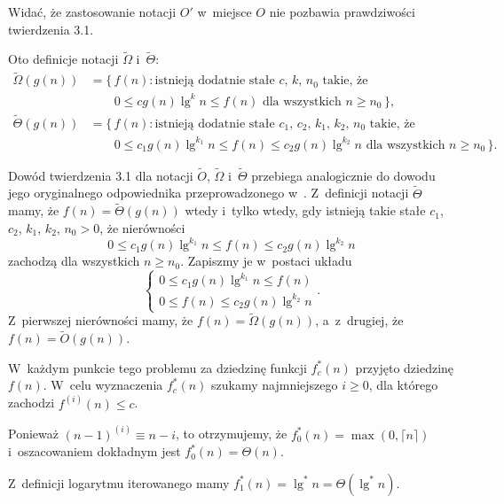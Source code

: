 Widać, że zastosowanie notacji $O'$ w~miejsce $O$ nie pozbawia prawdziwości twierdzenia 3.1.

\subproblem %
Oto definicje notacji $\widetilde{\Omega}$ i~$\widetilde{\Theta}$:
\[
	\begin{split}
		\widetilde{\Omega}(g(n)) &= \bigl\{\,f(n):\text{istnieją dodatnie stałe $c$, $k$, $n_0$ takie, że} \\
		&\qquad 0 \le cg(n)\lg^kn \le f(n) \text{ dla wszystkich $n \ge n_0$}\,\bigr\}, \\
		\widetilde{\Theta}(g(n)) &= \bigl\{\,f(n):\text{istnieją dodatnie stałe $c_1$, $c_2$, $k_1$, $k_2$, $n_0$ takie, że} \\
		&\qquad 0 \le c_1g(n)\lg^{k_1}n \le f(n) \le c_2g(n)\lg^{k_2}n \text{ dla wszystkich $n \ge n_0$}\,\bigr\}.
	\end{split}
\]

Dowód twierdzenia 3.1 dla notacji $\widetilde{O}$, $\widetilde{\Omega}$ i~$\widetilde{\Theta}$ przebiega analogicznie do dowodu jego oryginalnego odpowiednika przeprowadzonego w~.
Z~definicji notacji $\widetilde{\Theta}$ mamy, że $f(n)=\widetilde{\Theta}(g(n))$ wtedy i~tylko wtedy, gdy istnieją takie stałe $c_1$, $c_2$, $k_1$, $k_2$, $n_0>0$, że nierówności
\[
	0 \le c_1g(n)\lg^{k_1}n \le f(n) \le c_2g(n)\lg^{k_2}n
\]
zachodzą dla wszystkich $n\ge n_0$.
Zapiszmy je w~postaci układu
\[
	\begin{cases}
		0 \le c_1g(n)\lg^{k_1}n \le f(n) \\
		0 \le f(n) \le c_2g(n)\lg^{k_2}n
	\end{cases}.
\]
Z~pierwszej nierówności mamy, że $f(n)=\widetilde{\Omega}(g(n))$, a~z~drugiej, że $f(n)=\widetilde{O}(g(n))$.

W~każdym punkcie tego problemu za dziedzinę funkcji $f_c^*(n)$ przyjęto dziedzinę $f(n)$.
W~celu wyznaczenia $f_c^*(n)$ szukamy najmniejszego $i\ge0$, dla którego zachodzi $f^{(i)}(n)\le c$.

\subproblem %

\noindent Ponieważ $(n-1)^{(i)}\equiv n-i$, to otrzymujemy, że $f_0^*(n)=\max(0,\lceil n\rceil)$ i~oszacowaniem dokładnym jest $f_0^*(n)=\Theta(n)$.

\subproblem %

\noindent Z~definicji logarytmu iterowanego mamy $f_1^*(n)=\lg^*n=\Theta(\lg^*n)$.

